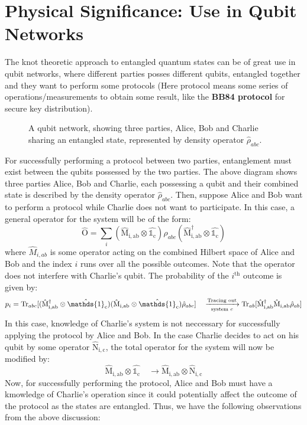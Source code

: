 \documentclass{scrartcl}
\begin{document}
\section{Physical Significance: Use in Qubit Networks}
The knot theoretic approach to entangled quantum states can be of great use in qubit networks, where different parties posses different qubits, entangled together and they want to perform some protocols (Here protocol means some series of operations/measurements to obtain some result, like the \textbf{BB84 protocol} for secure key distribution).
\begin{figure}[H]
    \centering

\caption{A qubit network, showing three parties, Alice, Bob and Charlie sharing an entangled state, represented by density operator $\hat{\rho}_{abc}$.}
\end{figure}
\noindent
For successfully performing a protocol between two parties, entanglement must exist between the qubits possessed by the two parties. The above diagram shows three parties Alice, Bob and Charlie, each possessing a qubit and their combined state is described by the density operator $\hat{\rho}_{abc}$. Then, suppose Alice and Bob want to perform a protocol while Charlie does not want to participate. In this case, a general operator for the system will be of the form:\\[0.2cm]
$$\hat{\mathrm{O}} = \sum\limits_i (\mathrm{\hat{M}_{i,ab}\otimes\hat{\mathds{1}_c}})\hat{\rho}_{abc}(\mathrm{\hat{M}^{\dagger}_{i,ab}\otimes\hat{\mathds{1}_c}})$$ where $\hat{M}_{i,ab}$ is some operator acting on the combined Hilbert space of Alice and Bob and the index $i$ runs over all the possible outcomes. Note that the operator does not interfere with Charlie's qubit. The probability of the $i^{\mathrm{th}}$ outcome is given by:
$$p_i = \Tr_{abc}[(\mathrm{\hat{M}^{\dagger}_{i,ab}\otimes\hat{\mathds{1}}_c})(\mathrm{\hat{M}_{i,ab}\otimes\hat{\mathds{1}}_c})\hat{\rho}_{abc}]\quad\xrightarrow[\text{system $c$}]{\text{Tracing out}} \Tr_{ab}[\mathrm{\hat{M}^{\dagger}_{i,ab}}\mathrm{\hat{M}_{i,ab}}\hat{\rho}_{ab}]$$
In this case, knowledge of Charlie's system is not neccessary for successfully applying the protocol by Alice and Bob. In the case Charlie decides to act on his qubit by some operator $\mathrm{\hat{N}_{i,c}}$, the total operator for the system will now be modified by:
$$\mathrm{\hat{M}_{i,ab}\otimes\hat{\mathds{1}_c}} \quad \longrightarrow \mathrm{\hat{M}_{i,ab}\otimes\hat{{N}}_{i,c}}$$
Now, for successfully performing the protocol, Alice and Bob must have a kmowledge of Charlie's operation since it could potentially affect the outcome of the protocol as the states are entangled. Thus, we have the following observations from the above discussion:
\end{document}

